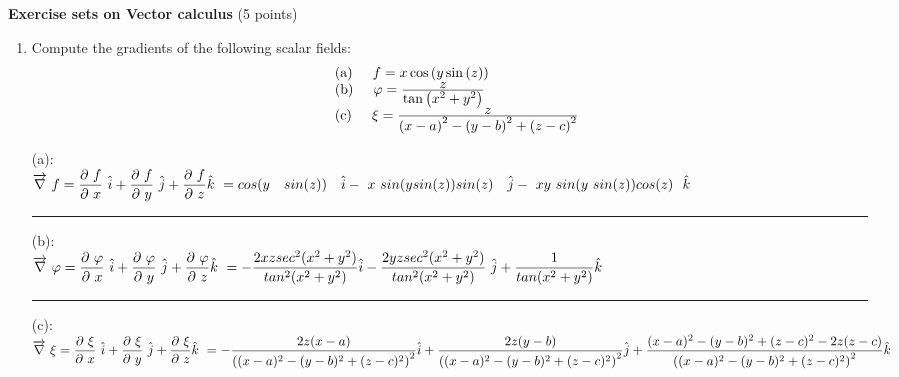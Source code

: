 \documentclass[fleqn]{article}
\begin{document}
  \textbf{Exercise sets on Vector calculus} (5 points)
  \begin{enumerate}
    \item Compute the gradients of the following scalar fields: \\
      \[
      \begin{array}{lll}
      & {\rm (a)\hspace{0.2in}} f=x\cos \left( y\sin \left( z\right) \right)  \\
      
      & {\rm (b)\hspace{0.2in} }\varphi =\frac{\textstyle z}{\textstyle\tan \left( x^{2}+y^{2}\right) } \\
      
      & {\rm
      (c)\hspace{0.2in}}\xi =\frac{\textstyle z}{\textstyle \left( x-a\right) ^{2}-\left( y-b\right) ^{2}+\left(z-c\right) ^{2}}
      \end{array}
      \]

      \textcolor{hwColor}{
        (a): \\ 
        $
          \overrightarrow{\nabla} f=\dfrac{\partial f}{\partial x} \hat{i}+\dfrac{\partial f}{\partial y} \hat{j}+\dfrac{\partial f}{\partial z}\hat{k} \\ 
          =cos(y ~ sin(z)) ~ \hat{i}- x sin(ysin(z))sin(z) ~ \hat{j}- xy sin(y sin(z))cos(z)~ \hat{k}
        $
      }

      \rule{15cm}{1pt}

      \textcolor{hwColor}{
        (b): \\
        $
          \overrightarrow{\nabla} \varphi=\dfrac{\partial \varphi}{\partial x} \hat{i}+\dfrac{\partial \varphi}{\partial y} \hat{j}+\dfrac{\partial \varphi}{\partial z}\hat{k} \\ 
          =-\dfrac{2xz sec^2(x^2+y^2)}{tan^2(x^2+y^2)} \hat{i}
          -\dfrac{2yz sec^2(x^2+y^2)}{tan^2(x^2+y^2)} \hat{j}
          +\dfrac{1}{tan(x^2+y^2)}\hat{k}
        $
      }

      \rule{15cm}{1pt}

      \textcolor{hwColor}{
        (c): \\ 
        $
          \overrightarrow{\nabla} \xi=\dfrac{\partial \xi}{\partial x} \hat{i}+\dfrac{\partial \xi}{\partial y} \hat{j}+\dfrac{\partial \xi}{\partial z}\hat{k} \\ 
          =-\dfrac{2z(x-a)}{\left((x-a)^2-(y-b)^2+(z-c)^2\right)^2} \hat{i} \\ \\   
          +\dfrac{2z(y-b)}{\left((x-a)^2-(y-b)^2+(z-c)^2\right)^2} \hat{j} \\ \\
          +\dfrac{(x-a)^2-(y-b)^2+(z-c)^2-2z(z-c)}{\left((x-a)^2-(y-b)^2+(z-c)^2\right)^2} \hat{k}
        $
      }
   

\end{enumerate}
\end{document}
